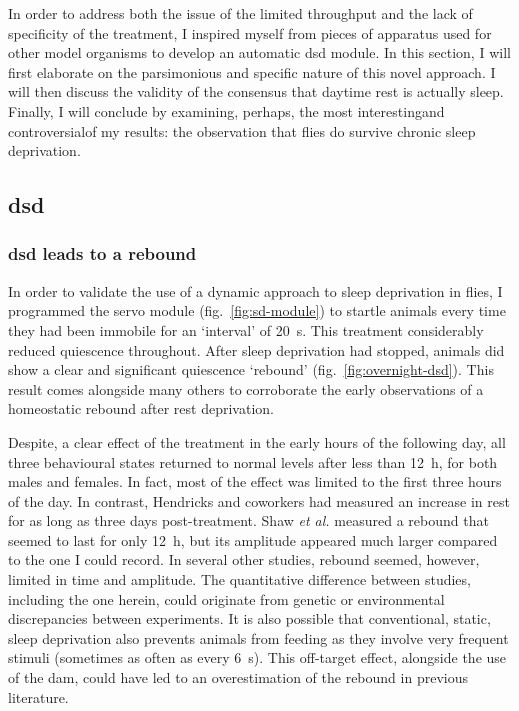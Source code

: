 In order to address both the issue of the limited throughput and the lack of specificity of the treatment, 
I inspired myself from pieces of apparatus used for other model organisms\cite{rechtschaffen_physiological_1983,rechtschaffen_sleep_1995,rechtschaffen_sleep_2002} to develop an automatic \acrfull{dsd} module.
In this section, I will first elaborate on the parsimonious and specific nature of this novel approach.
I will then discuss the validity of the consensus that daytime rest is actually sleep.
Finally, I will conclude by examining, perhaps, the most interesting\emd{}and controversial\emd{}of my results:
the observation that flies do survive chronic sleep deprivation.


\subsection{\acrfull{dsd}}

\subsubsection{\gls{dsd} leads to a rebound}

In order to validate the use of a dynamic approach to sleep deprivation in flies,
I programmed the servo module (fig.~\ref{fig:sd-module})  to startle animals every time they had been immobile for an `interval' of 20~s.
This treatment considerably reduced quiescence throughout.
After sleep deprivation had stopped, animals did show a clear and significant quiescence `rebound' (fig.~\ref{fig:overnight-dsd}).
This result comes alongside many others to corroborate the early observations of a homeostatic rebound after rest deprivation\cite{hendricks_need_2000,shaw_correlates_2000}.

Despite, a clear effect of the treatment in the early hours of the following day, all three behavioural states returned to normal levels after less than 12~h, for both males and females.
In fact, most of the effect was limited to the first three hours of the day.
In contrast, Hendricks and coworkers had measured an increase in rest for as long as three days post-treatment\cite{hendricks_rest_2000}.
Shaw \emph{et al.} measured a rebound that seemed to last for only 12~h, but its amplitude appeared much larger compared to the one I could record.
In several other studies, rebound seemed, however, limited in time and amplitude\cite{huber_sleep_2004, kume_dopamine_2005}.
The quantitative difference between studies, including the one herein, could originate from genetic or environmental discrepancies between experiments. 
It is also possible that conventional, static, sleep deprivation also prevents animals from feeding as they involve very frequent stimuli (sometimes as often as every 6~s\cite{shaw_correlates_2000,shaw_stress_2002}).
This off-target effect, alongside the use of the \gls{dam}, could have led to an overestimation of the rebound in previous literature.

